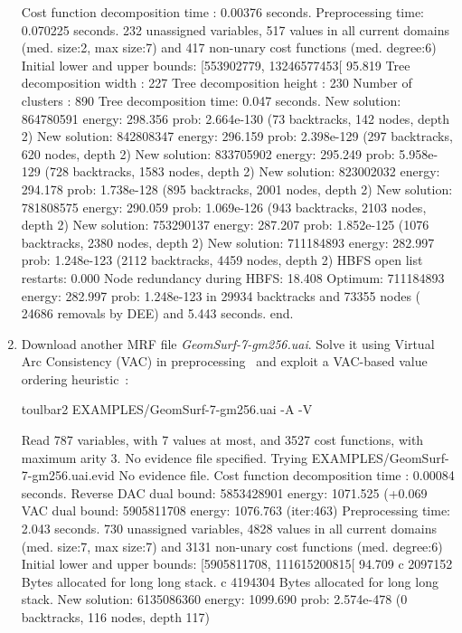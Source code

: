 \begin{enumerate}
{\begin{DoxyCode}
Cost function decomposition time : 0.00376 seconds.
Preprocessing time: 0.070225 seconds.
232 unassigned variables, 517 values in all current domains (med. size:2, max size:7) and 417 non-unary cost functions (med. degree:6)
Initial lower and upper bounds: [553902779, 13246577453[ 95.819%
Tree decomposition width  : 227
Tree decomposition height : 230
Number of clusters        : 890
Tree decomposition time: 0.047 seconds.
New solution: 864780591 energy: 298.356 prob: 2.664e-130 (73 backtracks, 142 nodes, depth 2)
New solution: 842808347 energy: 296.159 prob: 2.398e-129 (297 backtracks, 620 nodes, depth 2)
New solution: 833705902 energy: 295.249 prob: 5.958e-129 (728 backtracks, 1583 nodes, depth 2)
New solution: 823002032 energy: 294.178 prob: 1.738e-128 (895 backtracks, 2001 nodes, depth 2)
New solution: 781808575 energy: 290.059 prob: 1.069e-126 (943 backtracks, 2103 nodes, depth 2)
New solution: 753290137 energy: 287.207 prob: 1.852e-125 (1076 backtracks, 2380 nodes, depth 2)
New solution: 711184893 energy: 282.997 prob: 1.248e-123 (2112 backtracks, 4459 nodes, depth 2)
HBFS open list restarts: 0.000 %
Node redundancy during HBFS: 18.408 %
Optimum: 711184893 energy: 282.997 prob: 1.248e-123 in 29934 backtracks and 73355 nodes ( 24686 removals by DEE) and 5.443 seconds.
end.
\end{DoxyCode}}
\item Download another MRF file {\em GeomSurf-7-gm256.uai}. Solve it using Virtual Arc Consistency (VAC) in preprocessing~\cite{Cooper08} and exploit a VAC-based value ordering heuristic~\cite{Cooper10a}:
\begin{DoxyCode}
	toulbar2 EXAMPLES/GeomSurf-7-gm256.uai -A -V
\end{DoxyCode}
{\scriptsize
\begin{DoxyCode}
Read 787 variables, with 7 values at most, and 3527 cost functions, with maximum arity 3.
No evidence file specified. Trying EXAMPLES/GeomSurf-7-gm256.uai.evid
No evidence file. 
Cost function decomposition time : 0.00084 seconds.
Reverse DAC dual bound: 5853428901 energy: 1071.525 (+0.069%
VAC dual bound: 5905811708 energy: 1076.763 (iter:463)
Preprocessing time: 2.043 seconds.
730 unassigned variables, 4828 values in all current domains (med. size:7, max size:7) and 3131 non-unary cost functions (med. degree:6)
Initial lower and upper bounds: [5905811708, 111615200815[ 94.709%
c 2097152 Bytes allocated for long long stack.
c 4194304 Bytes allocated for long long stack.
New solution: 6135086360 energy: 1099.690 prob: 2.574e-478 (0 backtracks, 116 nodes, depth 117)

\end{DoxyCode}}
\end{enumerate}
